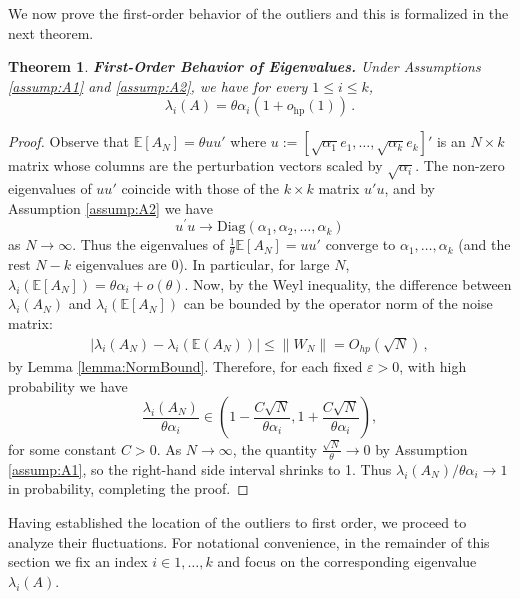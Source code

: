 \documentclass[11pt, reqno]{amsart}
\numberwithin{equation}{section}
\newtheorem{theorem}{Theorem}[section]
\newcommand{\E}{\mbox{${\mathbb E}$}}
\begin{document}
We now prove the first-order behavior of the outliers and this is formalized in the next theorem.
\begin{theorem}\label{Th.probedge}\textbf{First-Order Behavior of Eigenvalues.} Under Assumptions \eqref{assump:A1} and \eqref{assump:A2}, we have for every $1 \leq i \leq k$,
\[
\lambda_i(A) = \theta \alpha_i \left(1 + o_{\mathrm{hp}}(1)\right)\,.
\]
\end{theorem}

\begin{proof}
 Observe that $\E[A_N] = \theta uu'$ where $u := [\sqrt{\alpha_1}e_1, \ldots, \sqrt{\alpha_k}e_k]'$ is an $N\times k$ matrix whose columns are the perturbation vectors scaled by $\sqrt{\alpha_i}$. The non-zero eigenvalues of $uu'$ coincide with those of the $k\times k$ matrix $u' u$, and by Assumption \ref{assump:A2} we have
\[
u^\prime u \to \mathrm{Diag} \left(\alpha_1,\alpha_2,\ldots,\alpha_k\right)
\]
as $N\to\infty$. Thus the eigenvalues of $\frac{1}{\theta}\E[A_N] = u u'$ converge to $\alpha_1,\ldots,\alpha_k$ (and the rest $N-k$ eigenvalues are 0). In particular, for large $N$, $\lambda_i(\E[A_N]) = \theta \alpha_i + o(\theta)$. Now, by the Weyl inequality, the difference between $\lambda_i(A_N)$ and $\lambda_i(\E[A_N])$ can be bounded by the operator norm of the noise matrix:
\begin{align*}
\left|\lambda_i(A_N)-\lambda_i\left(\mathbb E(A_N)\right)\right|\le\|W_N\|=O_{hp}\left(\sqrt{N}\right)\,,
\end{align*}
 by Lemma \ref{lemma:NormBound}. Therefore, for each fixed $\varepsilon>0$, with high probability we have
\[
\frac{\lambda_i\left(A_N\right)}{\theta\alpha_i} \in\left(1-\frac{C \sqrt{N}}{\theta \alpha_i}, 1+\frac{C \sqrt{N}}{\theta \alpha_i}\right),\]
for some constant $C>0$. As $N\to\infty$, the quantity $\frac{\sqrt{N}}{\theta} \to 0$ by Assumption \ref{assump:A1}, so the right-hand side interval shrinks to 1. Thus $\lambda_i(A_N)/\theta \alpha_i \to 1$ in probability, completing the proof. 
\end{proof}

Having established the location of the outliers to first order, we proceed to analyze their fluctuations. For notational convenience, in the remainder of this section we fix an index $i \in {1,\ldots, k}$ and focus on the corresponding eigenvalue $\lambda_i(A)$. 
\end{document}
